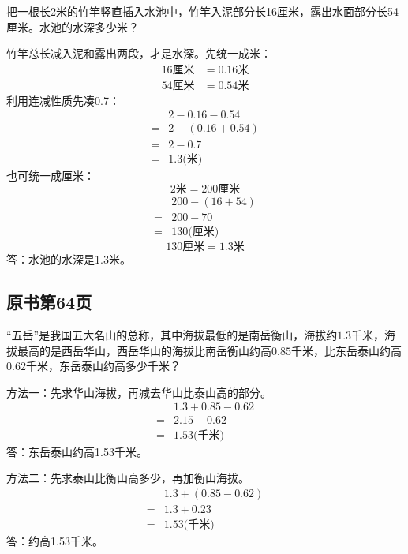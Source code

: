 把一根长2米的竹竿竖直插入水池中，竹竿入泥部分长16厘米，露出水面部分长54厘米。水池的水深多少米？\par
\begin{BookAnswer}
竹竿总长减入泥和露出两段，才是水深。先统一成米：\[\begin{aligned}16\text{厘米}&=0.16\text{米}\\54\text{厘米}&=0.54\text{米}\end{aligned}\]利用连减性质先凑0.7：\[\begin{aligned}&2-0.16-0.54\\={}&2-(0.16+0.54)\\={}&2-0.7\\={}&1.3\text{(米)}\end{aligned}\]也可统一成厘米：\[2\text{米}=200\text{厘米}\]\[\begin{aligned}&200-(16+54)\\={}&200-70\\={}&130\text{(厘米)}\end{aligned}\]\[130\text{厘米}=1.3\text{米}\]答：水池的水深是1.3米。
\end{BookAnswer}



\subsection*{原书第64页}

“五岳”是我国五大名山的总称，其中海拔最低的是南岳衡山，海拔约\(1.3\)千米，海拔最高的是西岳华山，西岳华山的海拔比南岳衡山约高\(0.85\)千米，比东岳泰山约高\(0.62\)千米，东岳泰山约高多少千米？\par
\begin{BookAnswer}
方法一：先求华山海拔，再减去华山比泰山高的部分。\[\begin{aligned}&1.3+0.85-0.62\\={}&2.15-0.62\\={}&1.53\text{(千米)}\end{aligned}\]答：东岳泰山约高1.53千米。\par 方法二：先求泰山比衡山高多少，再加衡山海拔。\[\begin{aligned}&1.3+(0.85-0.62)\\={}&1.3+0.23\\={}&1.53\text{(千米)}\end{aligned}\]答：约高1.53千米。
\end{BookAnswer}

